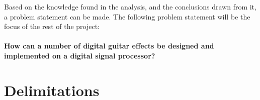 Based on the knowledge found in the analysis, and the conclusions drawn from it, a problem statement can be made. The following problem statement will be the focus of the rest of the project:
\\
\\
\textbf{How can a number of digital guitar effects be designed and implemented on a digital signal processor?}
\section{Delimitations}
